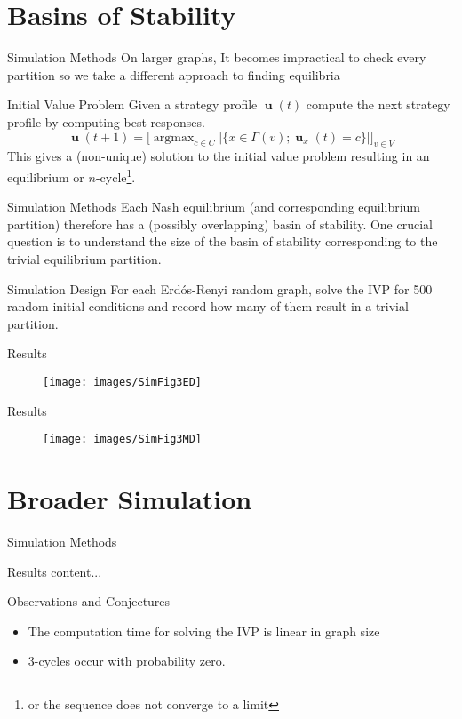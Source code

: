 \documentclass{beamer}
\DeclareMathOperator*{\argmax}{\text{argmax}}
\DeclareMathOperator{\uu}{\mathbf{u}}
\begin{document}
\section{Basins of Stability}
\begin{frame}{Simulation Methods}
	On larger graphs, It becomes impractical to check every partition so we take a different approach to finding equilibria
	\begin{block}{Initial Value Problem}
		Given a strategy profile $\uu(t)$ compute the next strategy profile by computing best responses.
		\begin{equation*}
			\uu(t+1)=\big[\argmax_{c\in C}|\{x\in\Gamma(v); \uu_x(t)=c\} |]_{v\in V}
		\end{equation*}
		This gives a (non-unique) solution to the initial value problem resulting in an equilibrium or $n$-cycle\footnote{or the sequence does not converge to a limit}.
	\end{block}
\end{frame}
\begin{frame}{Simulation Methods}
	Each Nash equilibrium (and corresponding equilibrium partition) therefore has a (possibly overlapping) basin of stability. One crucial question is to understand the size of the basin of stability corresponding to the trivial equilibrium partition. 
	\begin{block}{Simulation Design}
		For each Erd\'os-Renyi random graph, solve the IVP for 500 random initial conditions and record how many of them result in a trivial partition. 
	\end{block}
\end{frame}
\begin{frame}{Results}
	\begin{figure}
		\centering
		\texttt{[image: images/SimFig3ED]}
	\end{figure}
\end{frame}
\begin{frame}{Results}
	\begin{figure}
		\centering
		\texttt{[image: images/SimFig3MD]}
	\end{figure}
	\end{frame}
\section{Broader Simulation}
\begin{frame}{Simulation Methods}
	
\end{frame}
\begin{frame}{Results}
	content...
\end{frame}
\begin{frame}{Observations and Conjectures}
	\begin{itemize}
		\item The computation time for solving the IVP is linear in graph size
		\item $3$-cycles occur with probability zero. 
	\end{itemize}
\end{frame}
\end{document}
